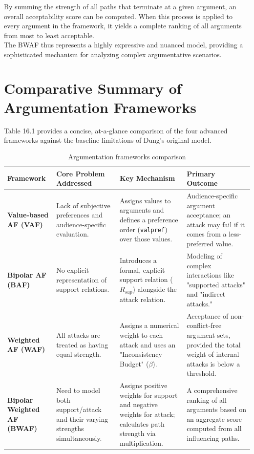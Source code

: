\documentclass{scrbook}
\begin{document}
By summing the strength of all paths that terminate at a given argument, an overall acceptability score can be computed. When this process is applied to every argument in the framework, it yields a complete ranking of all arguments from most to least acceptable. \\

The BWAF thus represents a highly expressive and nuanced model, providing a sophisticated mechanism for analyzing complex argumentative scenarios.

\chapter{Comparative Summary of Argumentation Frameworks}

Table 16.1 provides a concise, at-a-glance comparison of the four advanced frameworks against the baseline limitations of Dung's original model.

\begin{table}[htbp]
    \centering
    \begin{tabularx}{\textwidth}{|X|X|X|X|} \hline
        \textbf{Framework} & \textbf{Core Problem Addressed} & \textbf{Key Mechanism} & \textbf{Primary Outcome} \\ \hline

        \textbf{Value-based AF (VAF)} &
        Lack of subjective preferences and audience-specific evaluation. &
        Assigns values to arguments and defines a preference order (\texttt{valpref}) over those values. &
        Audience-specific argument acceptance; an attack may fail if it comes from a less-preferred value. \\ \hline

        \textbf{Bipolar AF (BAF)} &
        No explicit representation of support relations. &
        Introduces a formal, explicit support relation ($R_{sup}$) alongside the attack relation. &
        Modeling of complex interactions like "supported attacks" and "indirect attacks." \\ \hline

        \textbf{Weighted AF (WAF)} &
        All attacks are treated as having equal strength. &
        Assigns a numerical weight to each attack and uses an "Inconsistency Budget" ($\beta$). &
        Acceptance of non-conflict-free argument sets, provided the total weight of internal attacks is below a threshold. \\ \hline

        \textbf{Bipolar Weighted AF (BWAF)} &
        Need to model both support/attack and their varying strengths simultaneously. &
        Assigns positive weights for support and negative weights for attack; calculates path strength via multiplication. &
        A comprehensive ranking of all arguments based on an aggregate score computed from all influencing paths. \\ \hline
    \end{tabularx}
    \caption{Argumentation frameworks comparison}
\end{table}
\end{document}
